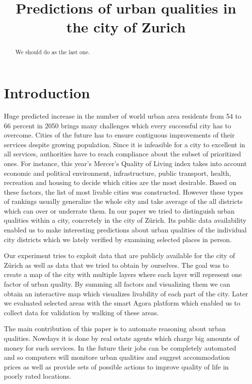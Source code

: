 \documentclass[letterpaper]{article}
\title{Predictions of urban qualities in the city of Zurich}
\begin{document}
%
\maketitle
%

\begin{abstract}
We should do as the last one.
\end{abstract}

\section{Introduction}\label{sec:intro}
Huge predicted increase in the number of world urban area residents from 54 to 66 percent in 2050 brings many challenges
which every successful city has to overcome. Cities of the future has to ensure contiguous improvements of their
services despite growing population. Since it is infeasible for a city to excellent in all services,
authorities have to reach compliance about the subset of prioritized ones. For instance, this year's Mercer's Quality of Living index
takes into account economic and political environment, infrastructure, public transport, health, recreation and housing
to decide which cities are the most desirable. Based on these factors, the list of most livable cities was constructed.
However these types of rankings usually generalize the whole city and take average of the all districts which can
over or underrate them. In our paper we tried to distinguish urban qualities within a city, concretely in the city of Zürich.
Its public data availability enabled us to make interesting predictions about urban qualities of the individual city districts
which we lately verified by examining selected places in person.

\indent Our experiment tries to exploit data that are publicly available for the city of Zürich as well as data that we tried to obtain by ourselves.
The goal was to create a map of the city with multiple layers where each layer will represent one factor of urban quality. By summing all factors and
visualizing them we can obtain an interactive map which visualizes livability of each part of the city. Later we evaluated selected areas with the smart
Agora platform which enabled us to collect data for validation by walking of these areas.

\indent The main contribution of this paper is to automate reasoning about urban qualities. Nowdays it is done by
real estate agents which charge big amounts of money for such services. In the future their jobs can be
completely automated and so computers will monitore urban qualities and suggest accommodation prices as well as
provide sets of possible actions to improve quality of life in poorly rated locations.
\end{document}
